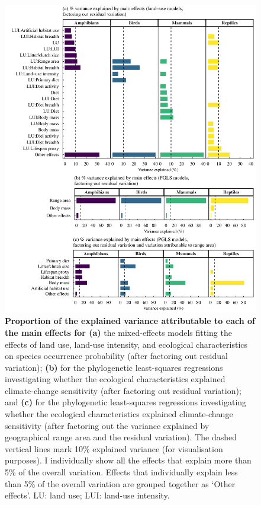 \pagebreak
\begin{figure}[h!]
\centering
\includegraphics[scale=0.7]{figures/Chapter4/Variance_breakdown.pdf}
\caption[Proportion of the explained variance attributable to each of the main effects in the land-use and climate-change sensitivity models]{\textbf{Proportion of the explained variance attributable to each of the main effects for (a)} the mixed-effects models fitting the effects of land use, land-use intensity, and ecological characteristics on species occurrence probability (after factoring out residual variation); \textbf{(b)} for the phylogenetic least-squares regressions investigating whether the ecological characteristics explained climate-change sensitivity (after factoring out residual variation); and \textbf{(c)} for the phylogenetic least-squares regressions investigating whether the ecological characteristics explained climate-change sensitivity (after factoring out the variance explained by geographical range area and the residual variation). The dashed vertical lines mark 10\% explained variance (for visualisation purposes). I individually show all the effects that explain more than 5\% of the overall variation. Effects that individually explain less than 5\% of the overall variation are grouped together as `Other effects'. LU: land use; LUI: land-use intensity.}
\label{chap4_fig4}
\end{figure}

